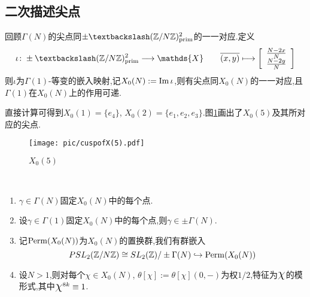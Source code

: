 \subsection{二次描述尖点}
\begin{theorem}
	回顾$\Gamma(N)$的尖点同$\pm\textbackslash(\mathbb{Z}/N\mathbb{Z})^2_{\prim}$的一一对应.定义
	$$\iota\colon \pm\textbackslash(\mathbb{Z}/N\mathbb{Z})^2_{\prim} \longrightarrow \mathds{X} \qquad \overline{(x,y)} \longmapsto \character{\frac{N-2x}{N}}{\frac{N-2y}{N}}$$
	则$\iota$为$\Gamma(1)$-等变的嵌入映射,记$X_0(N):=\operatorname{\operatorname{Im}} \iota$,则有尖点同$X_0(N)$的一一对应,且$\Gamma(1)$在$X_0(N)$上的作用可递.
\end{theorem}
\begin{example1}
	直接计算可得到$X_0(1)=\{e_4\}$, $X_0(2)=\{e_1,e_2,e_3\}$.图\ref{pic:cusps}画出了$X_0(5)$及其所对应的尖点.
	
	\begin{figure}[ht]
		\centering
		\texttt{[image: pic/cuspofX(5).pdf]}
		\caption{$X_0(5)$}
		\label{pic:cusps}
	\end{figure}
\end{example1}
\begin{theorem}\
	\begin{enumerate}[1.]
		\item $\gamma \in \Gamma(N)$固定$X_0(N)$中的每个点.
		\item 设$\gamma \in \Gamma(1)$固定$X_0(N)$中的每个点,则$\gamma \in \pm\Gamma(N)$.
		\item 记$\operatorname{\operatorname{Perm}}(X_0(N))$为$X_0(N)$的置换群,我们有群嵌入
		$$PSL_2(\mathbb{Z}/N\mathbb{Z}) \cong SL_2(\mathbb{Z})/\pm\Gamma(N) \hookrightarrow \operatorname{\operatorname{Perm}}(X_0(N))$$
		\item 设$N>1$,则对每个$\chi \in X_0(N)$, $\theta[\chi]:=\theta[\chi](0,-)$为权$1/2$,特征为$\mbox{\Large$\chi$}$的模形式,其中$\mbox{\Large$\chi$}^{8k} \equiv 1 $.
	\end{enumerate}
	
\end{theorem}
